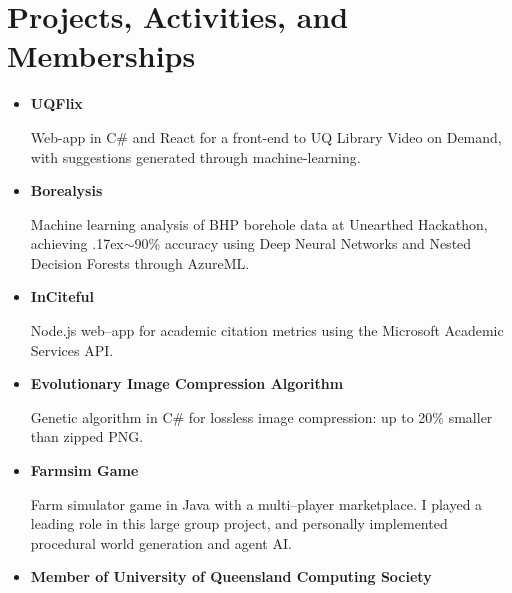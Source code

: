 \documentclass[a4paper]{article}
\newcommand{\dateitem}[1] {\item[\textbf{#1 :}]}
\renewcommand{\tilde} {{\raise.17ex\hbox{$\scriptstyle\mathtt{\sim}$}}}
\begin{document}
\section*{Projects, Activities, and Memberships}
\begin{itemize}
	\dateitem{2016} {\textbf{UQFlix}
		
		Web-app in C\# and React for a front-end to UQ Library Video on Demand, with suggestions generated through machine-learning.
	}
	\dateitem{2016} {\textbf{Borealysis}
		
		Machine learning analysis of BHP borehole data at Unearthed Hackathon, achieving \tilde{}90\% accuracy using Deep Neural Networks and Nested Decision Forests through AzureML.
	}
	\dateitem{2015} {\textbf{InCiteful}
		
		Node.js web--app for academic citation metrics using the Microsoft Academic Services API.
	}
	
	\dateitem{2013} {\textbf{Evolutionary Image Compression Algorithm}
		
		Genetic algorithm in C\# for lossless image compression: up to 20\% smaller than zipped PNG.
	}
	\dateitem{2015 -- 2016} {\textbf{Farmsim Game}
		
		Farm simulator game in Java with a multi--player marketplace.
		I played a leading role in this large group project, and personally implemented procedural world generation and agent AI. 
	}
	\dateitem{2014 -- Present} \textbf{Member of University of Queensland Computing Society}
\end{itemize}

\bigskip

\end{document}
